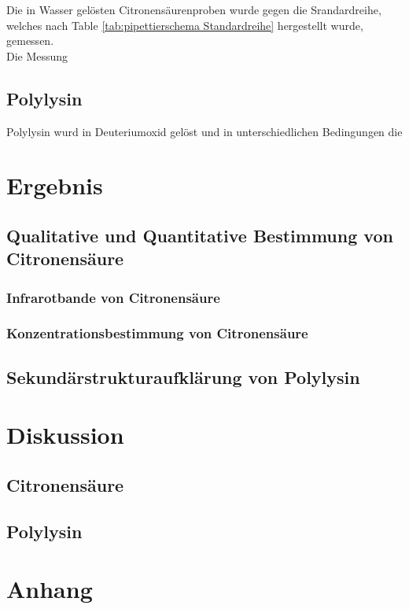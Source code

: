 \documentclass[10pt,a4paper]{article}
\begin{document}
	
	

	Die in Wasser gelösten Citronensäurenproben wurde gegen die Srandardreihe, welches nach Table \ref{tab:pipettierschema Standardreihe} hergestellt wurde, gemessen.\\
	Die Messung 
	
	\subsection{Polylysin}
	Polylysin wurd in Deuteriumoxid gelöst und in unterschiedlichen Bedingungen die 
	
	
	
	\section{Ergebnis}
	\subsection{Qualitative und Quantitative Bestimmung von Citronensäure}
	
	\subsubsection{Infrarotbande von Citronensäure}
	\subsubsection{Konzentrationsbestimmung von Citronensäure}
	\subsection{Sekundärstrukturaufklärung von Polylysin}
	
	
	
	\section{Diskussion}
	\subsection{Citronensäure}
	\subsection{Polylysin}
	
	\section{Anhang}
\end{document}
